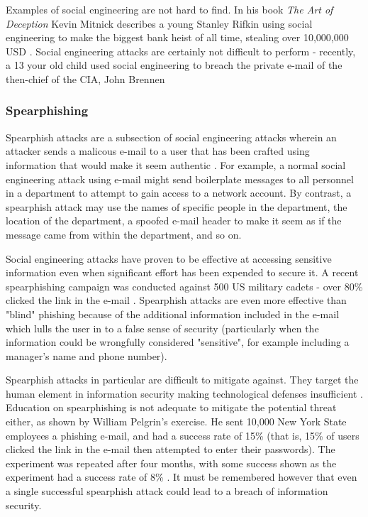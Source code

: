 \documentclass[12pt]{article}
\begin{document}
Examples of social engineering are not hard to find. In his book \textit{The Art of Deception} Kevin Mitnick describes a young Stanley Rifkin using social engineering to make the biggest bank heist of all time, stealing over 10,000,000 USD \citep{mitnick}. Social engineering attacks are certainly not difficult to perform - recently, a 13 your old child used social engineering to breach the private e-mail of the then-chief of the CIA, John Brennen \citep{cia13yearold}

\subsubsection{Spearphishing}
Spearphish attacks are a subsection of social engineering attacks wherein an attacker sends a malicous e-mail to a user that has been crafted using information that would make it seem authentic \citep{spearphishing}. For example, a normal social engineering attack using e-mail might send boilerplate messages to all personnel in a department to attempt to gain access to a network account. By contrast, a spearphish attack may use the names of specific people in the department, the location of the department, a spoofed e-mail header to make it seem as if the message came from within the department, and so on.

Social engineering attacks have proven to be effective at accessing sensitive information even when significant effort has been expended to secure it. A recent spearphishing campaign was conducted against 500 US military cadets - over 80\% clicked the link in the e-mail \citep{spearphishing}. Spearphish attacks are even more effective than "blind" phishing because of the additional information included in the e-mail which lulls the user in to a false sense of security (particularly when the information could be wrongfully considered "sensitive", for example including a manager's name and phone number).

Spearphish attacks in particular are difficult to mitigate against. They target the human element in information security making technological defenses insufficient \citep{spearphishing}. Education on spearphishing is not adequate to mitigate the potential threat either, as shown by William Pelgrin's exercise. He sent 10,000 New York State employees a phishing e-mail, and had a success rate of 15\% (that is, 15\% of users clicked the link in the e-mail then attempted to enter their passwords). The experiment was repeated after four months, with some success shown as the experiment had a success rate of 8\% \citep{spearphishingresults}. It must be remembered however that even a single successful spearphish attack could lead to a breach of information security.
\end{document}

